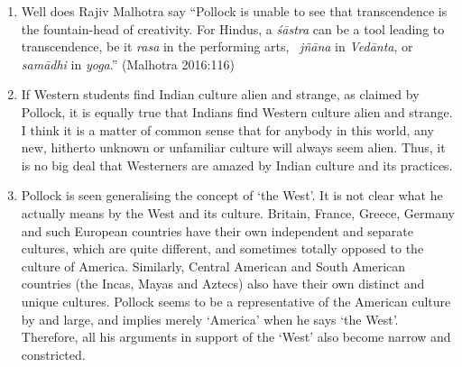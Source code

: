 \begin{enumerate}
\item Well does Rajiv Malhotra say ``Pollock is unable to see that transcendence is the fountain-head of creativity. For Hindus, a {\it śāstra} can be a tool leading to transcendence, be it {\it rasa} in the performing arts, \ {\it jñāna} in {\it Vedānta}, or {\it samādhi} in {\it yoga}.'' (Malhotra 2016:116)

\item If Western students find Indian culture alien and strange, as claimed by Pollock, it is equally true that Indians find Western culture alien and strange. I think it is a matter of common sense that for anybody in this world, any new, hitherto unknown or unfamiliar culture will always seem alien. Thus, it is no big deal that Westerners are amazed by Indian culture and its practices.

\item Pollock is seen generalising the concept of `the West'. It is not clear what he actually means by the West and its culture. Britain, France, Greece, Germany and such European countries have their own independent and separate cultures, which are quite different, and sometimes totally opposed to the culture of America. Similarly, Central American and South American countries (the Incas, Mayas and Aztecs) also have their own distinct and unique cultures. Pollock seems to be a representative of the American culture by and large, and implies merely `America' when he says `the West'. Therefore, all his arguments in support of the `West' also become narrow and constricted. 
\end{enumerate}


